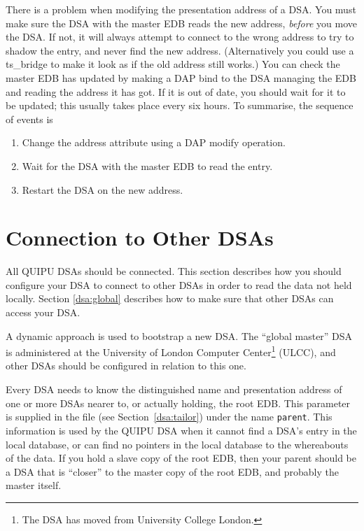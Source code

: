 There is a problem when modifying the presentation address
 of a DSA. 
You must make
sure the DSA with the master EDB reads the new address, {\em before} you
move the DSA.  If not, it will always attempt to connect to the wrong
address to try to shadow the entry, and never find the new address.
(Alternatively you could use a ts\_bridge to make it look as if the 
old address still works.)
You can check the master EDB has updated by making a DAP 
bind to the DSA managing the EDB
and reading the address it has got.
If it is out of date, you should wait for it to be updated; this
usually takes place every six hours.
To summarise, the sequence of events is
\begin{enumerate}
\item Change the address attribute using a DAP modify operation.
\item Wait for the DSA with the master EDB to read the entry.
\item Restart the DSA on the new address.
\end{enumerate}


\section {Connection to Other DSAs}

\label{dsa:connect}

All QUIPU DSAs should be connected. This section describes how you should 
configure your DSA to connect to other DSAs in order
to read the data not held locally.
Section \ref{dsa:global} describes how to make sure that other DSAs 
can access your DSA.

A dynamic approach is used to bootstrap a new DSA.
The ``global master'' DSA is administered at 
the University of London Computer Center\footnote{The DSA has moved from
University College London.} (ULCC),
and other DSAs should be configured in relation to this one.

Every DSA needs to know the distinguished name and
presentation address of one
or more DSAs nearer to, or actually holding, the root EDB.  This parameter
is supplied in the  file (see Section~\ref{dsa:tailor})
under the name \verb"parent".
This information is used by the QUIPU DSA when it cannot find a DSA's entry
in the local database, or can find no pointers in the local database to the
whereabouts of the data.
If you hold a slave copy of the root EDB, then your 
parent should be a DSA that is ``closer'' to the master copy of the root
EDB, and probably the master itself.


